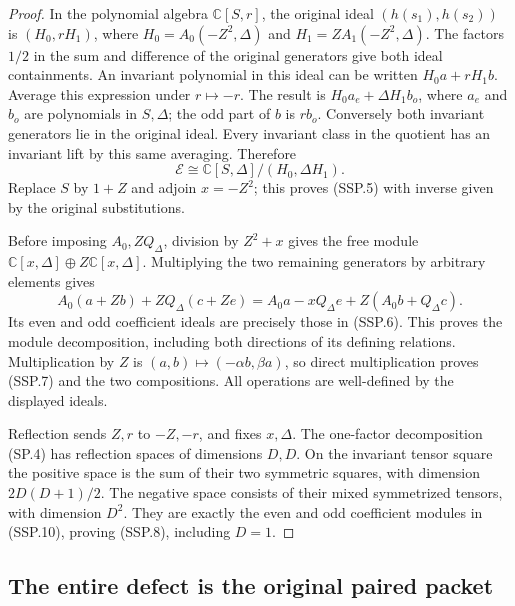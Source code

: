 \begin{proof}
In the polynomial algebra \(\mathbb C[S,r]\), the original ideal
\((h(s_1),h(s_2))\) is \((H_0,rH_1)\), where
\(H_0=A_0(-Z^2,\Delta)\) and \(H_1=ZA_1(-Z^2,\Delta)\).
The factors \(1/2\) in the sum and difference of the original
generators give both ideal containments.  An invariant polynomial
in this ideal can be written \(H_0a+rH_1b\).
Average this expression under \(r\mapsto-r\).  The result is
\(H_0a_e+\Delta H_1b_o\), where
\(a_e\) and \(b_o\) are polynomials in \(S,\Delta\);
the odd part of \(b\) is \(rb_o\).
Conversely both invariant generators lie in the original ideal.
Every invariant class in the quotient has an invariant lift by
this same averaging.  Therefore
\[
 \mathcal E\cong\mathbb C[S,\Delta]/(H_0,\Delta H_1).
 \tag{SSP.9}
\]
Replace \(S\) by \(1+Z\) and adjoin \(x=-Z^2\); this proves (SSP.5)
with inverse given by the original substitutions.

Before imposing \(A_0,ZQ_\Delta\), division by \(Z^2+x\)
gives the free module \(\mathbb C[x,\Delta]\oplus
Z\mathbb C[x,\Delta]\).  Multiplying the two remaining generators
by arbitrary elements gives
\[
 A_0(a+Zb)+ZQ_\Delta(c+Ze)
   =A_0a-xQ_\Delta e+Z(A_0b+Q_\Delta c).
 \tag{SSP.10}
\]
Its even and odd coefficient ideals are precisely those in
(SSP.6).  This proves the module decomposition, including both
directions of its defining relations.  Multiplication by \(Z\)
is \((a,b)\mapsto(-\alpha b,\beta a)\), so direct multiplication
proves (SSP.7) and the two compositions.  All operations are
well-defined by the displayed ideals.

Reflection sends \(Z,r\) to \(-Z,-r\), and fixes \(x,\Delta\).
The one-factor decomposition (SP.4) has reflection spaces
of dimensions \(D,D\).  On the invariant tensor square the
positive space is the sum of their two symmetric squares,
with dimension \(2D(D+1)/2\).  The negative space consists
of their mixed symmetrized tensors, with dimension \(D^2\).
They are exactly the even and odd coefficient modules in
(SSP.10), proving (SSP.8), including \(D=1\).
\end{proof}

\subsection{The entire defect is the original paired packet}

